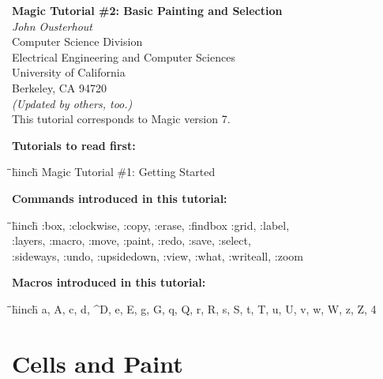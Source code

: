 \documentclass[letterpaper,twoside,12pt]{article}
\def\hinch{\hspace*{0.5in}}
\def\starti{\begin{center}\begin{tabbing}\hinch\=\hinch\=\hinch\=hinch\=\kill}
\def\endi{\end{tabbing}\end{center}}
\def\mytitle{Magic Tutorial \#2: Basic Painting and Selection}
\begin{document}
\makeatletter
\newcommand{\ps@magic}{%
	\renewcommand{\@oddhead}{\mytitle\hfil\today}%
	\renewcommand{\@evenhead}{\today\hfil\mytitle}%
	\renewcommand{\@evenfoot}{\hfil\textrm{--{\thepage}--}\hfil}%
	\renewcommand{\@oddfoot}{\@evenfoot}}
\newcommand{\ps@mplain}{%
	\renewcommand{\@oddhead}{}%
	\renewcommand{\@evenhead}{}%
	\renewcommand{\@evenfoot}{\hfil\textrm{--{\thepage}--}\hfil}%
	\renewcommand{\@oddfoot}{\@evenfoot}}
\makeatother
\pagestyle{magic}
\thispagestyle{mplain}


\begin{center}
  {\bfseries \Large \mytitle} \\
  \vspace*{0.5in}
  {\itshape John Ousterhout} \\
  \vspace*{0.5in}
   Computer Science Division \\
   Electrical Engineering and Computer Sciences \\
   University of California \\
   Berkeley, CA  94720 \\
  \vspace*{0.25in}
  {\itshape (Updated by others, too.)} \\
  \vspace*{0.25in}
  This tutorial corresponds to Magic version 7. \\
\end{center}
\vspace*{0.5in}

{\noindent\bfseries\large Tutorials to read first:}
\starti
   \> Magic Tutorial  \#1: Getting Started
\endi

{\noindent\bfseries\large Commands introduced in this tutorial:}
\starti
   \> :box, :clockwise, :copy, :erase, :findbox :grid, :label, \\
   \> :layers, :macro, :move, :paint, :redo, :save, :select, \\
   \>:sideways, :undo, :upsidedown, :view, :what, :writeall, :zoom
\endi

{\noindent\bfseries\large Macros introduced in this tutorial:}

\starti
   \> a, A, c, d, \^{}D, e, E, g, G, q, Q, r, R, s, S, t, T, u, U, v, w, W, z, Z, 4
\endi

\vspace*{0.75in}
\section{Cells and Paint}
\end{document}
